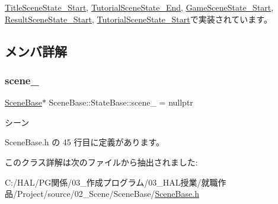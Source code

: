 \mbox{\hyperlink{class_title_scene_state___start_a2e98cf6810711b58766d7147168d02eb}{Title\+Scene\+State\+\_\+\+Start}}, \mbox{\hyperlink{class_tutorial_scene_state___end_a7cdf03fa9a0e41ab86c2b41b8165ad09}{Tutorial\+Scene\+State\+\_\+\+End}}, \mbox{\hyperlink{class_game_scene_state___start_ae11bb8d8ea9eae4fea2a9acf33dd1c8b}{Game\+Scene\+State\+\_\+\+Start}}, \mbox{\hyperlink{class_result_scene_state___start_a2ecdef2bef0cd1a04055e8687e11199b}{Result\+Scene\+State\+\_\+\+Start}}, \mbox{\hyperlink{class_tutorial_scene_state___start_a93c322692bf56172f383d3e5b17cd85c}{Tutorial\+Scene\+State\+\_\+\+Start}}で実装されています。



\subsection{メンバ詳解}
\mbox{\label{class_scene_base_1_1_state_base_ae1062afb3f96664e24504151eaccf40f}} 
\subsubsection{\texorpdfstring{scene\+\_\+}{scene\_}}
{\footnotesize\ttfamily \mbox{\hyperlink{class_scene_base}{Scene\+Base}}$\ast$ Scene\+Base\+::\+State\+Base\+::scene\+\_\+ = nullptr\hspace{0.3cm}{\ttfamily [protected]}}



シーン 



 Scene\+Base.\+h の 45 行目に定義があります。



このクラス詳解は次のファイルから抽出されました\+:\begin{DoxyCompactItemize}
\item 
C\+:/\+H\+A\+L/\+P\+G関係/03\+\_\+作成プログラム/03\+\_\+\+H\+A\+L授業/就職作品/\+Project/source/02\+\_\+\+Scene/\+Scene\+Base/\mbox{\hyperlink{_scene_base_8h}{Scene\+Base.\+h}}\end{DoxyCompactItemize}
